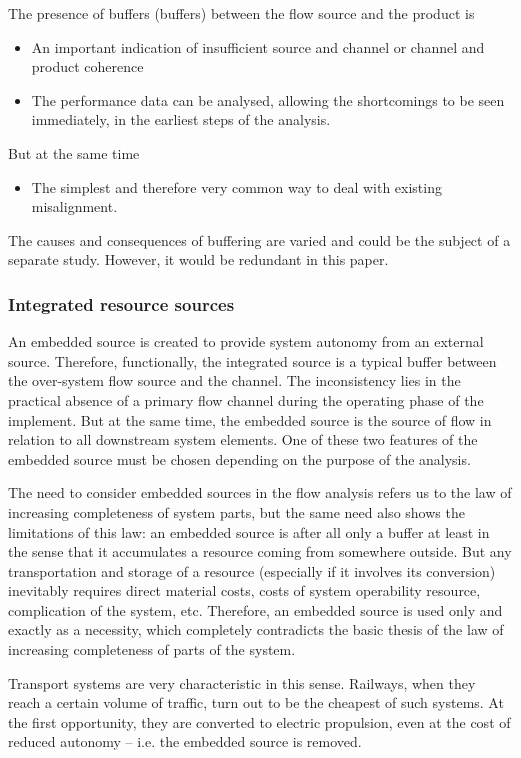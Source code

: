 \documentclass[a4paper,11pt]{article}
\begin{document}
The presence of buffers (buffers) between the flow source and the product is
\begin{itemize}
\item An important indication of insufficient source and channel or channel
  and product coherence
\item The performance data can be analysed, allowing the shortcomings to be
  seen immediately, in the earliest steps of the analysis.
\end{itemize}
But at the same time
\begin{itemize}
\item The simplest and therefore very common way to deal with existing
  misalignment.
\end{itemize}
The causes and consequences of buffering are varied and could be the subject
of a separate study. However, it would be redundant in this paper.

\subsubsection*{Integrated resource sources}

An embedded source is created to provide system autonomy from an external
source. Therefore, functionally, the integrated source is a typical buffer
between the over-system flow source and the channel. The inconsistency lies in
the practical absence of a primary flow channel during the operating phase of
the implement. But at the same time, the embedded source is the source of flow
in relation to all downstream system elements. One of these two features of
the embedded source must be chosen depending on the purpose of the analysis.

The need to consider embedded sources in the flow analysis refers us to the
law of increasing completeness of system parts, but the same need also shows
the limitations of this law: an embedded source is after all only a buffer at
least in the sense that it accumulates a resource coming from somewhere
outside. But any transportation and storage of a resource (especially if it
involves its conversion) inevitably requires direct material costs, costs of
system operability resource, complication of the system, etc. Therefore, an
embedded source is used only and exactly as a necessity, which completely
contradicts the basic thesis of the law of increasing completeness of parts of
the system.

Transport systems are very characteristic in this sense. Railways, when they
reach a certain volume of traffic, turn out to be the cheapest of such
systems. At the first opportunity, they are converted to electric propulsion,
even at the cost of reduced autonomy -- i.e. the embedded source is removed.
\end{document}
